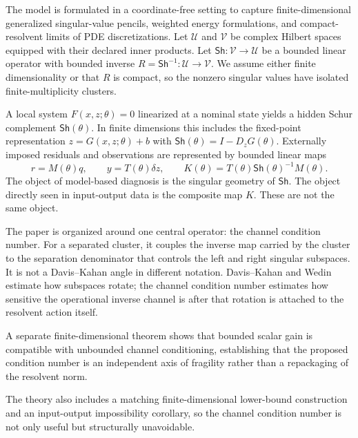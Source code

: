 \documentclass[review]{siamart220329}
\theoremstyle{definition}
\theoremstyle{remark}
\newcommand{\calU}{\mathcal{U}}
\newcommand{\calV}{\mathcal{V}}
\newcommand{\Sh}{\mathsf{Sh}}
\begin{document}
The model is formulated in a coordinate-free setting to capture finite-dimensional generalized singular-value pencils, weighted energy formulations, and compact-resolvent limits of PDE discretizations. Let $\calU$ and $\calV$ be complex Hilbert spaces equipped with their declared inner products. Let $\Sh:\calV\to\calU$ be a bounded linear operator with bounded inverse $R=\Sh^{-1}:\calU\to\calV$. We assume either finite dimensionality or that $R$ is compact, so the nonzero singular values have isolated finite-multiplicity clusters.

A local system $F(x,z;\theta)=0$ linearized at a nominal state yields a hidden Schur complement $\Sh(\theta)$. In finite dimensions this includes the fixed-point representation $z=G(x,z;\theta)+b$ with $\Sh(\theta)=I-D_zG(\theta)$. Externally imposed residuals and observations are represented by bounded linear maps
\begin{equation}
    r=M(\theta)q,
    \qquad y=T(\theta)\delta z,
    \qquad K(\theta)=T(\theta)\Sh(\theta)^{-1}M(\theta).
    \label{eq:composite-response}
\end{equation}
The object of model-based diagnosis is the singular geometry of $\Sh$. The object directly seen in input-output data is the composite map $K$. These are not the same object.

The paper is organized around one central operator: the channel condition number. For a separated cluster, it couples the inverse map carried by the cluster to the separation denominator that controls the left and right singular subspaces. It is not a Davis--Kahan angle in different notation. Davis--Kahan and Wedin estimate how subspaces rotate; the channel condition number estimates how sensitive the operational inverse channel is after that rotation is attached to the resolvent action itself. 

A separate finite-dimensional theorem shows that bounded scalar gain is compatible with unbounded channel conditioning, establishing that the proposed condition number is an independent axis of fragility rather than a repackaging of the resolvent norm.

The theory also includes a matching finite-dimensional lower-bound construction and an input-output impossibility corollary, so the channel condition number is not only useful but structurally unavoidable.
\end{document}
